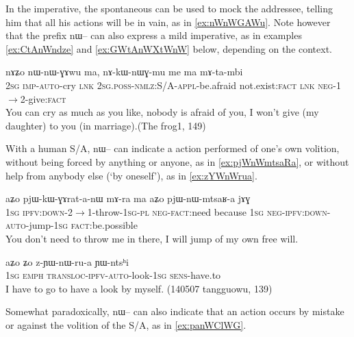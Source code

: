 \documentclass[oldfontcommands,oneside,a4paper,11pt]{article}
\newcommand{\ipa}[1]{{\phon \mbox{#1}}} %
\begin{document}
In the imperative, the spontaneous can be used to mock the addressee, telling him that all his actions will be in vain, as in \ref{ex:nWnWGAWu}. Note however that the prefix \ipa{nɯ--} can also express a mild imperative, as in examples \ref{ex:CtAnWndze} and \ref{ex:GWtAnWXtWnW} below, depending on the context.

\begin{exe}
\ex \label{ex:nWnWGAWu}
\gll 
\ipa{nɤʑo} 	\ipa{nɯ-nɯ-ɣɤwu} 	\ipa{ma,} 	\ipa{nɤ-kɯ-nɯɣ-mu} 	\ipa{me} 	\ipa{ma} 	\ipa{mɤ-ta-mbi} \\
\textsc{2sg} \textsc{imp-auto}-cry \textsc{lnk} \textsc{2sg.poss-nmlz}:S/A-\textsc{appl}-be.afraid not.exist:\textsc{fact} \textsc{lnk} \textsc{neg}-1$\rightarrow$2-give:\textsc{fact} \\
\glt You can cry as much as you like, nobody is afraid of you, I won't give (my daughter) to you (in marriage).(The frog1, 149)
\end{exe}

With a human S/A, \ipa{nɯ--} can indicate a action performed of one's own volition, without being forced by anything or anyone, as in \ref{ex:pjWnWmtsaRa}, or without help from anybody else (`by oneself'), as in \ref{ex:zYWnWrua}.

\begin{exe}
\ex \label{ex:pjWnWmtsaRa}
\gll 
\ipa{aʑo} 	\ipa{pjɯ-kɯ-ɣɤrat-a-nɯ} 	\ipa{mɤ-ra} 	\ipa{ma} 	\ipa{aʑo} 	\ipa{pjɯ-nɯ-mtsaʁ-a} 	\ipa{jɤɣ} \\
\textsc{1sg} \textsc{ipfv:down}-2$\rightarrow$1-throw-\textsc{1sg-pl} \textsc{neg-fact}:need because \textsc{1sg} \textsc{neg-ipfv:down-auto}-jump-\textsc{1sg} \textsc{fact}:be.possible \\
\glt You don't need to throw me in there, I will jump of my own free will.
\end{exe}



\begin{exe}
\ex \label{ex:zYWnWrua}
\gll
\ipa{aʑo} 	\ipa{ʑo} 	\ipa{z-ɲɯ-nɯ-ru-a} 	\ipa{ɲɯ-ntsʰi} \\
\textsc{1sg} \textsc{emph} \textsc{transloc-ipfv-auto}-look-\textsc{1sg} \textsc{sens}-have.to \\
\glt I have to go to have a look by myself. (140507 tangguowu, 139)
\end{exe} 



Somewhat paradoxically, \ipa{nɯ--} can also indicate that an action occurs by mistake or against the volition of the S/A, as in \ref{ex:panWClWG}.
\end{document}
